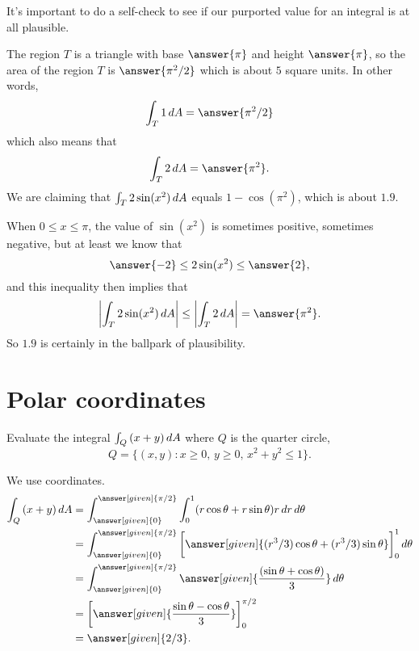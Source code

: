 \documentclass{ximera}
\begin{document}
\begin{question}
  It's important to do a self-check to see if our purported value for
  an integral is at all plausible.

  The region $T$ is a triangle with base $\answer{\pi}$ and height
  $\answer{\pi}$, so the area of the region $T$ is $\answer{\pi^2/2}$
  which is about $5$ square units.  In other words,
  \[
  \int_T 1 \d A = \answer{\pi^2/2}
  \]
  which also means that
  \[
  \int_T 2 \d A = \answer{\pi^2}.
  \]
  We are claiming that $\int_T 2 \sin (x^2) \mathop{}\!d A$ equals
  $1 - \cos (\pi^2)$, which is about $1.9$.

  When $0 \leq x \leq \pi$, the value of $\sin (x^2)$ is sometimes
  positive, sometimes negative, but at least we know that
  \[
  \answer{-2} \leq 2 \sin (x^2) \leq \answer{2},
  \]
  and this inequality then implies that
  \[
  \left| \int_T 2 \sin (x^2) \d A \right| \leq \left| \int_T 2 \d A \right| = \answer{\pi^2}.
  \]
  So $1.9$ is certainly in the ballpark of plausibility.
\end{question}

\section{Polar coordinates}

\begin{example}
  Evaluate the integral $\int_Q \left(x + y\right) \mathop{}\!d A$ where $Q$ is the quarter circle,
  \[
  Q = \{ (x,y)  : \text{$x \geq 0$, $y \geq 0$, $x^2 + y^2 \leq 1$} \}.
  \]
  
  \begin{explanation}
    We use  coordinates.
    \begin{align*}
      \int_Q \left(x + y\right) \d A
      &= \int_{\answer[given]{0}}^{\answer[given]{\pi/2}} \int_{0}^{1} (r \cos \theta + r \sin \theta) r \d r \d \theta \\
      &= \int_{\answer[given]{0}}^{\answer[given]{\pi/2}} \eval{\answer[given]{
          (r^3/3) \cos \theta + (r^3/3) \sin \theta
      }}_0^1\d \theta \\  
      &= \int_{\answer[given]{0}}^{\answer[given]{\pi/2}}\answer[given]{\frac{(\sin \theta + \cos \theta)}{3}}\d\theta\\
      &= \eval{\answer[given]{\frac{\sin \theta - \cos \theta}{3}}}_{0}^{\pi/2} \\
      &= \answer[given]{2/3}.
    \end{align*}
  \end{explanation}
\end{example}
\end{document}
